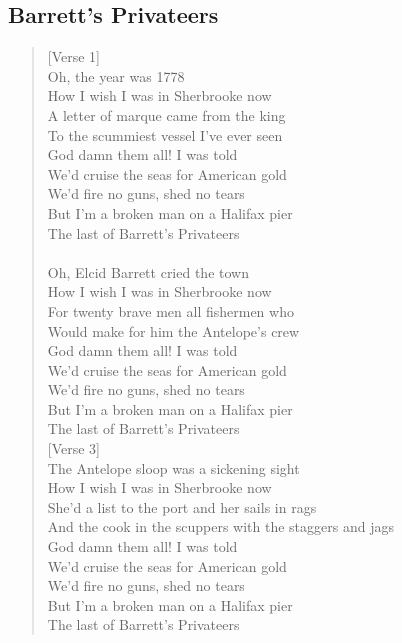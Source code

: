 \documentclass[11pt]{article}
\begin{document}
\subsection{Barrett's Privateers}
\label{sec:org68570d3}
\begin{verse}
[Verse 1]\\
Oh, the year was 1778\\
How I wish I was in Sherbrooke now\\
A letter of marque came from the king\\
To the scummiest vessel I've ever seen\\
God damn them all! I was told\\
We'd cruise the seas for American gold\\
We'd fire no guns, shed no tears\\
But I'm a broken man on a Halifax pier\\
The last of Barrett's Privateers\\
[Verse 2]\\
Oh, Elcid Barrett cried the town\\
How I wish I was in Sherbrooke now\\
For twenty brave men all fishermen who\\
Would make for him the Antelope's crew\\
God damn them all! I was told\\
We'd cruise the seas for American gold\\
We'd fire no guns, shed no tears\\
But I'm a broken man on a Halifax pier\\
The last of Barrett's Privateers\\
\vspace*{1em}
[Verse 3]\\
The Antelope sloop was a sickening sight\\
How I wish I was in Sherbrooke now\\
She'd a list to the port and her sails in rags\\
And the cook in the scuppers with the staggers and jags\\
God damn them all! I was told\\
We'd cruise the seas for American gold\\
We'd fire no guns, shed no tears\\
But I'm a broken man on a Halifax pier\\
The last of Barrett's Privateers\\
\vspace*{1em}

\end{verse}
\end{document}
